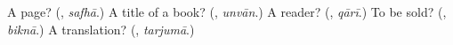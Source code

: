 \begin{tcolorbox}[breakable,colback=teal!4,colframe=teal!35!black,title={Before you move on}]
A page? (\textbf{}, \emph{safhā}.) A title of a book? (\textbf{}, \emph{unvān}.) A reader? (\textbf{}, \emph{qārī}.) To be sold? (\textbf{}, \emph{biknā}.) A translation? (\textbf{}, \emph{tarjumā}.)
\end{tcolorbox}
